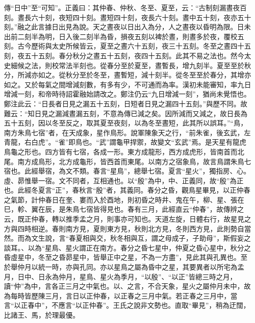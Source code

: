 {\noindent\zhuan{}\fzbyks 傳“日中”至“可知”。正義曰：其仲春、仲秋、冬至、夏至，云：“古制刻漏晝夜百刻。晝長六十刻，夜短四十刻。晝短四十刻，夜長六十刻。晝中五十刻，夜亦五十刻。”融之此言據日出見為說。天之晝夜以日出入為分，人之晝夜以昏明為限。日未出前二刻半為明，日入後二刻半為昏，損夜五刻以裨於晝，則晝多於夜，覆校五刻。古今歷術與太史所候皆云，夏至之晝六十五刻，夜三十五刻。冬至之晝四十五刻，夜五十五刻。春分秋分之晝五十五刻，夜四十五刻。此其不易之法也。然今太史細候之法，則校常法半刻也。從春分至於夏至，晝暫長，增九刻半。夏至至於秋分，所減亦如之。從秋分至於冬至，晝暫短，減十刻半。從冬至至於春分，其增亦如之。又於每氣之間增減刻數，有多有少，不可通而為率。漢初未能審知，率九日增減一刻，和帝時待詔霍融始請改之。鄭注仍云“九日增減一刻”，猶尚未覺悟也。鄭注此云：“日長者日見之漏五十五刻，日短者日見之漏四十五刻。”與歷不同。故難云：“知日見之漏減晝漏五刻，不意為傳已減之矣。因所減而又減之，故日長為五十五刻，因以冬至反之，取其夏至夜刻，以為冬至晝短，此其所以誤耳。”“鳥，南方朱鳥七宿”者，在天成象，星作鳥形。說軍陳象天之行，“前朱雀，後玄武，左青龍，右白虎”。“雀”即鳥也。“武”謂龜甲捍禦，故變文“玄武”焉。是天星有龍虎鳥龜之形也。四方皆有七宿，各成一形。東方成龍形，西方成虎形，皆南首而北尾。南方成鳥形，北方成龜形，皆西首而東尾。以南方之宿象鳥，故言鳥謂朱鳥七宿也。此經舉宿，為文不類。春言“星鳥”，總舉七宿。夏言“星火”，獨指房、心。虛、昴惟舉一宿。文不同者，互相通也。以“殷”為中，中、正義同，故“殷”為正也。此經冬夏言“正”，春秋言“殷”者，其義同。春分之昏，觀鳥星畢見，以正仲春之氣節，計仲春日在奎、婁而入於酉地，則初昏之時井、鬼在午，柳、星、張在巳，軫、翼在辰，是朱鳥七宿皆得見也。春有三月，此經直云“仲春”，故傳辨之云，既正仲春，轉以推季孟之月，則事亦可知也。天道左旋，日體右行，故星見之方與四時相逆。春則南方見，夏則東方見，秋則北方見，冬則西方見，此則勢自當然。而為文生說，言“春夏相與交，秋冬相與互，謂之母成子，子助母”，斯假妄之談耳。、以為“星鳥、星火謂正在南方。春分之昏七星中，仲夏之昏心星中，秋分之昏虛星中，冬至之昏昴星中，皆舉正中之星，不為一方盡”，見此其與孔異也。至於舉仲月以統一時，亦與孔同。亦以星鳥之屬為昏中之星，其要異者以所宅為孟月，日中、日永為仲月，星鳥、星火為季月，“以殷”、“以正”皆總三時之月，讀“仲”為中，言各正三月之中氣也。以、之言，不合天象，星火之屬仲月未中，故為每時皆歷陳三月，言日以正仲春，以正春之三月中氣。若正春之三月中，當言“以正春中”，不應言“以正仲春”。王氏之說非文勢也。直取“畢見”，稍為迂闊，比諸王、馬，於理最優。 \par}

